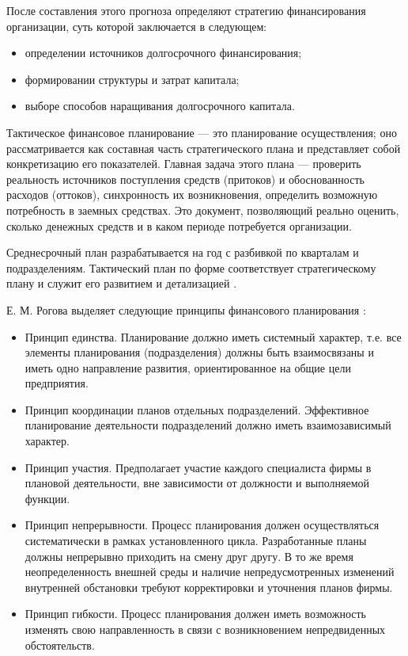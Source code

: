 После составления этого прогноза определяют стратегию финансирования организации, суть которой заключается в следующем:
\begin{itemize}
	\item определении источников долгосрочного финансирования;
	\item формировании структуры и затрат капитала;
	\item выборе способов наращивания долгосрочного капитала.
\end{itemize}

Тактическое финансовое планирование --- это планирование осуществления; оно рассматривается как составная часть стратегического плана и представляет собой конкретизацию его показателей.
Главная задача этого плана --- проверить реальность источников поступления средств (притоков) и обоснованность расходов (оттоков), синхронность их возникновения, определить возможную потребность в заемных средствах.
Это документ, позволяющий реально оценить, сколько денежных средств и в каком периоде потребуется организации.

Среднесрочный план разрабатывается на год с разбивкой по кварталам и подразделениям.
Тактический план по форме соответствует стратегическому плану и служит его развитием и детализацией \cite[179]{kirichenko}.

Е. М. Рогова выделяет следующие принципы финансового планирования \cite[70--72]{rogova}:
\begin{itemize}
	\item Принцип единства.
	Планирование должно иметь системный характер, т.е. все элементы планирования (подразделения) должны быть взаимосвязаны и иметь одно направление развития, ориентированное на общие цели предприятия.
	\item Принцип координации планов отдельных подразделений.
	Эффективное планирование деятельности подразделений должно иметь взаимозависимый характер.
	\item Принцип участия.
	Предполагает участие каждого специалиста фирмы в плановой деятельности, вне зависимости от должности и выполняемой функции.
	\item Принцип непрерывности.
	Процесс планирования должен осуществляться систематически в рамках установленного цикла.
	Разработанные планы должны непрерывно приходить на смену друг другу.
	В то же время неопределенность внешней среды и наличие непредусмотренных изменений внутренней обстановки требуют корректировки и уточнения планов фирмы.
	\item Принцип гибкости.
	Процесс планирования должен иметь возможность изменять свою направленность в связи с возникновением непредвиденных обстоятельств.
	
\end{itemize}















